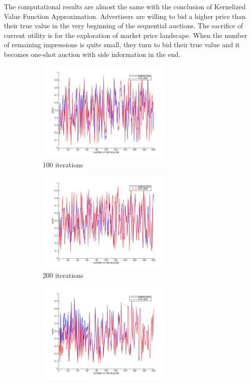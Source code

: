 The computational results are almost the same with the conclusion of Kernelized Value Function Approximation. Advertisers are willing to bid a higher price than their true value in the very beginning of the sequential auctions. The sacrifice of current utility is for the exploration of market price landscape. When the number of remaining impressions is quite small, they turn to bid their true value and it becomes one-shot auction with side information in the end.
\begin{figure}[htbp]

\begin{subfigure}{0.5\textwidth}
\includegraphics[width=0.9\linewidth, height=5cm]{Q100.png}
\caption{100 iterations}
\label{fig:Q100}
\end{subfigure}
\begin{subfigure}{0.5\textwidth}
\includegraphics[width=0.9\linewidth, height=5cm]{Q200.png}
\caption{200 iterations}
\label{fig:Q200}
\end{subfigure}
\begin{subfigure}{0.5\textwidth}
\includegraphics[width=0.9\linewidth, height=5cm]{Q300.png}

\end{subfigure}
\end{figure}

